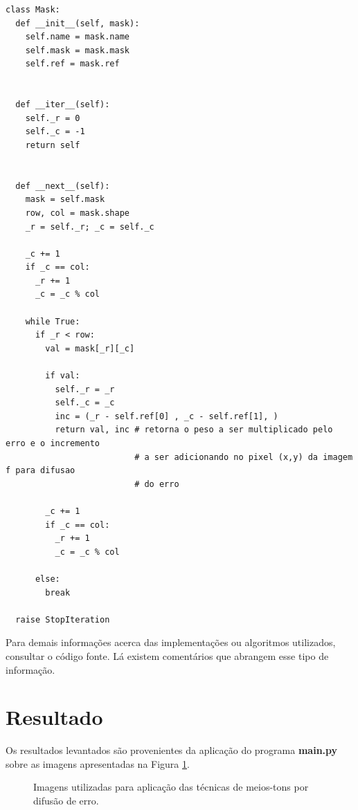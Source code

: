 \documentclass{article}
\begin{document}
\begin{lstlisting}
class Mask:
  def __init__(self, mask):
    self.name = mask.name
    self.mask = mask.mask
    self.ref = mask.ref


  def __iter__(self):
    self._r = 0
    self._c = -1 
    return self


  def __next__(self):
    mask = self.mask
    row, col = mask.shape
    _r = self._r; _c = self._c

    _c += 1
    if _c == col:
      _r += 1 
      _c = _c % col

    while True:
      if _r < row:
        val = mask[_r][_c]

        if val:
          self._r = _r
          self._c = _c
          inc = (_r - self.ref[0] , _c - self.ref[1], )
          return val, inc # retorna o peso a ser multiplicado pelo erro e o incremento
                          # a ser adicionando no pixel (x,y) da imagem f para difusao
                          # do erro

        _c += 1
        if _c == col:
          _r += 1 
          _c = _c % col

      else:
        break

  raise StopIteration
\end{lstlisting}


Para demais informações acerca das implementações ou algoritmos utilizados, consultar o código fonte. Lá existem comentários que abrangem esse tipo de informação.

%
\section{Resultado}
Os resultados levantados são provenientes da aplicação do programa \textbf{main.py} sobre as imagens apresentadas na Figura \ref{fig:imagem:entrada}. 

\begin{figure}[!htp]%
	\centering
	\qquad
	\caption{Imagens utilizadas para aplicação das técnicas de meios-tons por difusão de erro.}%
	\label{fig:imagem:entrada}%
\end{figure}
\end{document}
